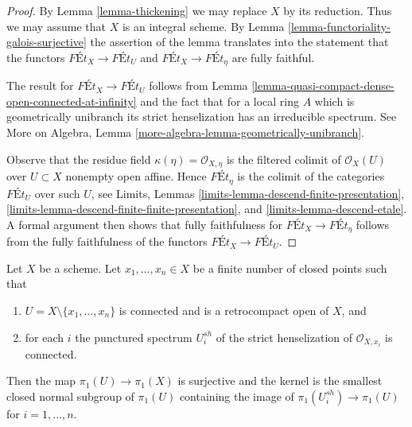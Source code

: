 \begin{proof}
By Lemma \ref{lemma-thickening} we may replace $X$ by its reduction.
Thus we may assume that $X$ is an integral scheme. By
Lemma \ref{lemma-functoriality-galois-surjective}
the assertion of the lemma translates into the statement that
the functors $\textit{F\'Et}_X \to \textit{F\'Et}_U$ and
$\textit{F\'Et}_X \to \textit{F\'Et}_\eta$ are fully faithful.

\medskip\noindent
The result for $\textit{F\'Et}_X \to \textit{F\'Et}_U$ follows
from Lemma \ref{lemma-quasi-compact-dense-open-connected-at-infinity}
and the fact that for a local ring $A$ which is
geometrically unibranch its strict henselization has an
irreducible spectrum. See
More on Algebra, Lemma \ref{more-algebra-lemma-geometrically-unibranch}.

\medskip\noindent
Observe that the residue field $\kappa(\eta) = \mathcal{O}_{X, \eta}$
is the filtered colimit of $\mathcal{O}_X(U)$ over $U \subset X$
nonempty open affine. Hence $\textit{F\'Et}_\eta$ is the colimit of the
categories $\textit{F\'Et}_U$ over such $U$, see
Limits, Lemmas \ref{limits-lemma-descend-finite-presentation},
\ref{limits-lemma-descend-finite-finite-presentation}, and
\ref{limits-lemma-descend-etale}.
A formal argument then shows that fully faithfulness for
$\textit{F\'Et}_X \to \textit{F\'Et}_\eta$ follows from the
fully faithfulness of the functors $\textit{F\'Et}_X \to \textit{F\'Et}_U$.
\end{proof}

\begin{lemma}
\label{lemma-exact-sequence-finite-nr-closed-pts}
Let $X$ be a scheme. Let $x_1, \ldots, x_n \in X$ be a finite
number of closed points such that
\begin{enumerate}
\item $U = X \setminus \{x_1, \ldots, x_n\}$ is connected and is
a retrocompact open of $X$, and
\item for each $i$ the punctured spectrum $U_i^{sh}$ of the
strict henselization of $\mathcal{O}_{X, x_i}$ is connected.
\end{enumerate}
Then the map $\pi_1(U) \to \pi_1(X)$ is surjective and the kernel
is the smallest closed normal subgroup of $\pi_1(U)$ containing
the image of $\pi_1(U_i^{sh}) \to \pi_1(U)$ for $i = 1, \ldots, n$.
\end{lemma}

